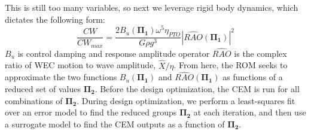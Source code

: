 \documentclass[10pt,twoside]{article}
\begin{document}
This is still too many variables, so next we leverage rigid body dynamics, which dictates the following form:
\begin{equation}
    \label{eq:CW-fraction}
    \frac{CW}{CW_{max}} = \frac{2 B_u(\mathbf{\Pi_1}) \omega^5 \eta_{PTO}}{G \rho g^3} |\widehat{RAO}(\mathbf{\Pi_1})|^2
\end{equation}
$B_u$ is control damping and response amplitude operator $\widehat{RAO}$ is the complex ratio of WEC motion to wave amplitude, $\hat{X}/\eta$.
From here, the ROM seeks to approximate the two functions $B_u(\mathbf{\Pi_1})$ and $\widehat{RAO}(\mathbf{\Pi_1})$ as functions of a reduced set of values $\mathbf{\Pi_2}$.
Before the design optimization, the CEM is run for all combinations of $\mathbf{\Pi_2}$.
During design optimization, we perform a least-squares fit over an error model to find the reduced groups $\mathbf{\Pi_2}$ at each iteration, and then use a surrogate model to find the CEM outputs as a function of $\mathbf{\Pi_2}$.
\end{document}
